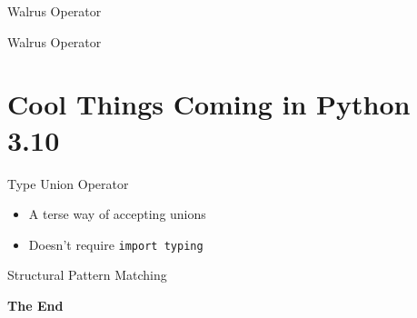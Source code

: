 \documentclass[aspectratio=169,xcolor=dvipsnames]{beamer}
\begin{document}
\begin{frame}{Walrus Operator}
  \begin{example}
  
  \end{example}
\end{frame}


\begin{frame}{Walrus Operator}
  \begin{example}
  
  \end{example}
\end{frame}

\section{Cool Things Coming in Python 3.10}

\begin{frame}{Type Union Operator}
    \begin{itemize}
      \item A terse way of accepting unions
      \item Doesn't require \texttt{import typing}
  \begin{example}
    
  \end{example}
  \end{itemize}
\end{frame}


\begin{frame}{Structural Pattern Matching}
  \begin{example}
  
  \end{example}
\end{frame}


\begin{frame}
    \Huge{\centerline{\textbf{The End}}}
\end{frame}

\end{document}
